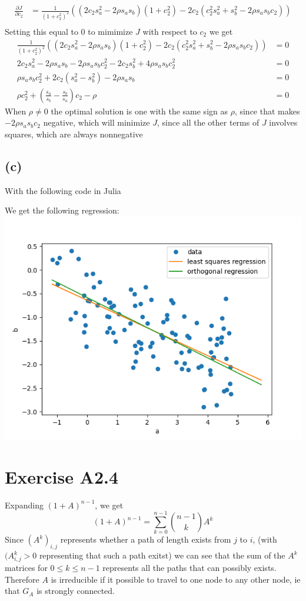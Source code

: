\begin{align*}
	\frac{\partial J}{\partial c_2}&=\frac{1}{(1+c_2^2)^2}\left((2c_2s_a^2-2\rho s_a s_b)(1+c_2^2)-2c_2(c_2^2s_a^2+s_b^2-2\rho s_a s_b c_2)\right)\\
\end{align*}
Setting this equal to 0 to mimimize $J$ with respect to $c_2$ we get
\begin{align*}
	\frac{1}{(1+c_2^2)^2}\left((2c_2s_a^2-2\rho s_a s_b)(1+c_2^2)-2c_2(c_2^2s_a^2+s_b^2-2\rho s_a s_b c_2)\right)&=0\\
	2c_2s_a^2-2\rho s_a s_b -2\rho s_a s_b c_2^2-2c_2s_b^2+4\rho s_as_b c_2^2&=0\\
	\rho s_as_bc_2^2+2c_2(s_a^2-s_b^2)-2\rho s_a s_b &=0\\
	\rho c_2^2+\left(\frac{s_a}{s_b}-\frac{s_b}{s_a}\right)c_2-\rho &=0
\end{align*}
When $\rho\neq0$ the optimal solution is one with the same sign as 
$\rho$, since that makes $-2\rho s_a s_b c_2$ negative, which will minimize $J$, since all the other terms of $J$ involves squares, which are always nonnegative
\subsection*{(c)}
With the following code in Julia 

We get the following regression:\\
\includegraphics[scale=0.5]{test.png}
\section*{Exercise A2.4}
Expanding $(1+A)^{n-1}$, we get
$$
(1+A)^{n-1}=\sum_{k=0}^{n-1}{{n-1} \choose {k}} A^k$$
Since $(A^k)_{i,j}$ represents whether a path of length exists from $j$ to $i$, (with $(A^k_{i,j}>0$ representing that such a path exitst)
we can see that the sum of the $A^k$ matrices for $0\leq k \leq n-1$ represents all the paths that can possibly exists. Therefore $A$ is
irreducible if it possible to travel to one node to any other node, ie that $G_A$ is strongly connected.

